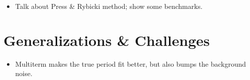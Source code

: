\documentclass[preprint]{aastex}
\begin{document}
\begin{itemize}
\item Talk about Press \& Rybicki method; show some benchmarks.
\end{itemize}

\section{Generalizations \& Challenges}

\begin{itemize}
\item Multiterm makes the true period fit better, but also bumps the background noise.
\end{itemize}

\citet{VanderPlas2015}



\end{document}
